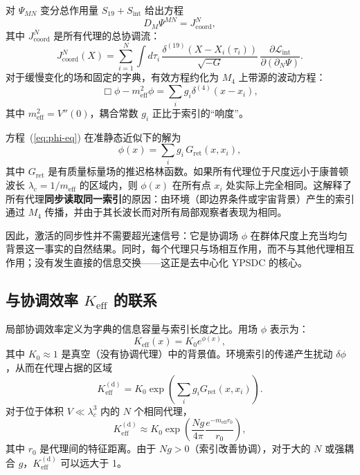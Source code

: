 \documentclass[11pt,a4paper]{article}
\newcommand{\Keff}{K_{\mathrm{eff}}}
\begin{document}
	对 \(\Psi_{MN}\) 变分总作用量 \(S_{19} + S_{\mathrm{int}}\) 给出方程
	\begin{equation}
		D_M \Psi^{MN} = J^{N}_{\mathrm{coord}},
		\label{eq:Psi-eq}
	\end{equation}
	其中 \(J^{N}_{\mathrm{coord}}\) 是所有代理的总协调流：
	\begin{equation}
		J^{N}_{\mathrm{coord}}(X) = \sum_{i=1}^{N} \int d\tau_i\, \frac{\delta^{(19)}(X - X_i(\tau_i))}{\sqrt{-G}}\, \frac{\partial \mathcal{L}_{\mathrm{int}}}{\partial (\partial_N \Psi)}.
	\end{equation}
	对于缓慢变化的场和固定的字典，有效方程约化为 \(M_4\) 上带源的波动方程：
	\begin{equation}
		\Box \phi - m_{\mathrm{eff}}^2 \phi = \sum_{i} g_i \delta^{(4)}(x - x_i),
		\label{eq:phi-eq}
	\end{equation}
	其中 \(m_{\mathrm{eff}}^2 = V''(0)\)，耦合常数 \(g_i\) 正比于索引的“响度”。
	
	方程~(\ref{eq:phi-eq}) 在准静态近似下的解为
	\begin{equation}
		\phi(x) = \sum_i g_i \, G_{\mathrm{ret}}(x, x_i),
	\end{equation}
	其中 \(G_{\mathrm{ret}}\) 是有质量标量场的推迟格林函数。如果所有代理位于尺度远小于康普顿波长 \(\lambda_c = 1/m_{\mathrm{eff}}\) 的区域内，则 \(\phi(x)\) 在所有点 \(x_i\) 处实际上完全相同。这解释了所有代理\textbf{同步读取同一索引}的原因：由环境（即边界条件或宇宙背景）产生的索引通过 \(M_4\) 传播，并由于其长波长而对所有局部观察者表现为相同。
	
	因此，激活的同步性并不需要超光速信号：它是协调场 \(\phi\) 在群体尺度上充当均匀背景这一事实的自然结果。同时，每个代理只与场相互作用，而不与其他代理相互作用；没有发生直接的信息交换——这正是去中心化 YPSDC 的核心。
	
	\subsection{与协调效率 \(K_{\mathrm{eff}}\) 的联系}
	
	局部协调效率定义为字典的信息容量与索引长度之比。用场 \(\phi\) 表示为：
	\begin{equation}
		\Keff(x) = K_0 e^{\phi(x)},
		\label{eq:Keff-field}
	\end{equation}
	其中 \(K_0 \approx 1\) 是真空（没有协调代理）中的背景值。环境索引的传递产生扰动 \(\delta\phi\)，从而在代理占据的区域
	\begin{equation}
		\Keff^{\mathrm{(d)}} = K_0 \exp\!\left( \sum_i g_i G_{\mathrm{ret}}(x, x_i) \right).
	\end{equation}
	对于位于体积 \(V \ll \lambda_c^3\) 内的 \(N\) 个相同代理，
	\begin{equation}
		\Keff^{\mathrm{(d)}} \approx K_0 \exp\!\left( \frac{N g}{4\pi} \frac{e^{-m_{\mathrm{eff}} r_0}}{r_0} \right),
	\end{equation}
	其中 \(r_0\) 是代理间的特征距离。由于 \(N g > 0\)（索引改善协调），对于大的 \(N\) 或强耦合 \(g\)，\(\Keff^{\mathrm{(d)}}\) 可以远大于 1。
	
\end{document}
